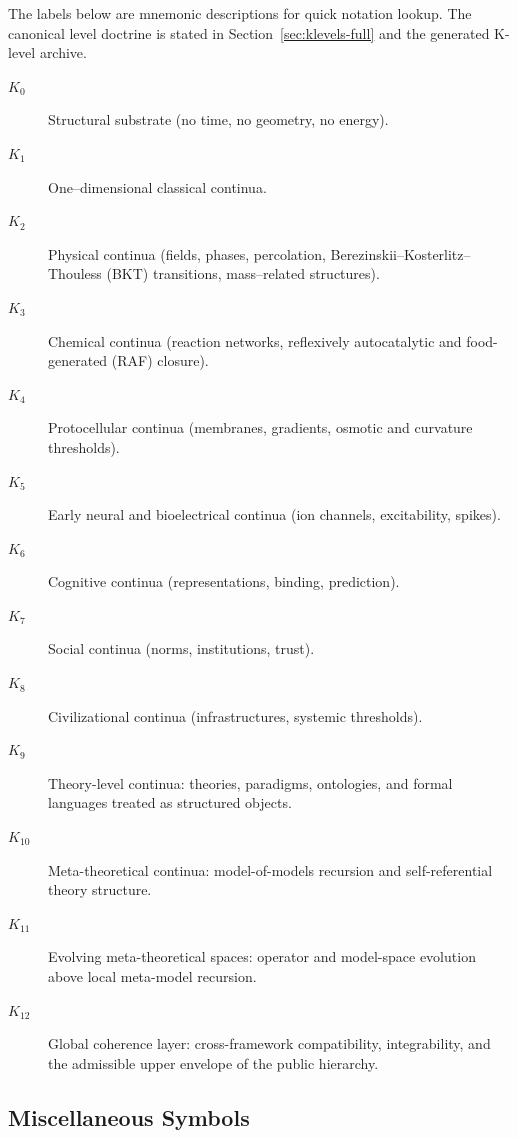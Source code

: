 The labels below are mnemonic descriptions for quick notation lookup. The
canonical level doctrine is stated in Section~\ref{sec:klevels-full} and the
generated K-level archive.

\begin{description}
  \item[\(K_0\)] Structural substrate (no time, no geometry, no energy).
  \item[\(K_1\)] One--dimensional classical continua.
  \item[\(K_2\)] Physical continua (fields, phases, percolation,
        Berezinskii--Kosterlitz--Thouless (BKT) transitions,
        mass--related structures).
  \item[\(K_3\)] Chemical continua (reaction networks,
        reflexively autocatalytic and food-generated (RAF) closure).
  \item[\(K_4\)] Protocellular continua (membranes, gradients, osmotic and
        curvature thresholds).
  \item[\(K_5\)] Early neural and bioelectrical continua (ion channels,
        excitability, spikes).
  \item[\(K_6\)] Cognitive continua (representations, binding, prediction).
  \item[\(K_7\)] Social continua (norms, institutions, trust).
  \item[\(K_8\)] Civilizational continua (infrastructures, systemic
        thresholds).
  \item[\(K_9\)] Theory-level continua: theories, paradigms, ontologies, and
        formal languages treated as structured objects.
  \item[\(K_{10}\)] Meta-theoretical continua: model-of-models recursion and
        self-referential theory structure.
  \item[\(K_{11}\)] Evolving meta-theoretical spaces: operator and model-space
        evolution above local meta-model recursion.
  \item[\(K_{12}\)] Global coherence layer: cross-framework compatibility,
        integrability, and the admissible upper envelope of the public
        hierarchy.
\end{description}

\subsection{Miscellaneous Symbols}

